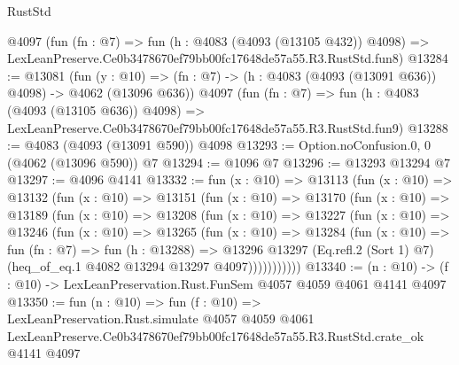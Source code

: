 \begin{lexlean}{RustStd}
\begin{coremodule}
    @4097
    (fun (fn : @7) =>
    fun (h : @4083 (@4093 (@13105 @432)) @4098) =>
    LexLeanPreserve.Ce0b3478670ef79bb00fc17648de57a55.R3.RustStd.fun8)
@13284 := @13081
    (fun (y : @10) => (fn : @7) -> (h : @4083 (@4093 (@13091 @636)) @4098) -> @4062 (@13096 @636))
    @4097
    (fun (fn : @7) =>
    fun (h : @4083 (@4093 (@13105 @636)) @4098) =>
    LexLeanPreserve.Ce0b3478670ef79bb00fc17648de57a55.R3.RustStd.fun9)
@13288 := @4083 (@4093 (@13091 @590)) @4098
@13293 := Option.noConfusion.{0, 0} (@4062 (@13096 @590)) @7
@13294 := @1096 @7
@13296 := @13293 @13294 @7
@13297 := @4096 @4141
@13332 := fun (x : @10) =>
  @13113
    (fun (x : @10) =>
    @13132
      (fun (x : @10) =>
      @13151
        (fun (x : @10) =>
        @13170
          (fun (x : @10) =>
          @13189
            (fun (x : @10) =>
            @13208
              (fun (x : @10) =>
              @13227
                (fun (x : @10) =>
                @13246
                  (fun (x : @10) =>
                  @13265
                    (fun (x : @10) =>
                    @13284
                      (fun (x : @10) =>
                      fun (fn : @7) =>
                      fun (h : @13288) =>
                      @13296
                        @13297
                        (Eq.refl.{2} (Sort 1) @7)
                        (heq_of_eq.{1} @4082 @13294 @13297 @4097)))))))))))
@13340 := (n : @10) -> (f : @10) -> LexLeanPreservation.Rust.FunSem @4057 @4059 @4061 @4141 @4097
@13350 := fun (n : @10) =>
  fun (f : @10) =>
  LexLeanPreservation.Rust.simulate
    @4057
    @4059
    @4061
    LexLeanPreserve.Ce0b3478670ef79bb00fc17648de57a55.R3.RustStd.crate_ok
    @4141
    @4097
\end{coremodule}
\end{lexlean}
